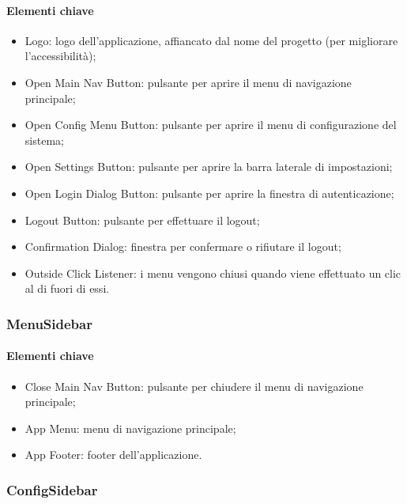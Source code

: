 \paragraph*{Elementi chiave}
\begin{itemize}
  \item Logo: logo dell'applicazione, affiancato dal nome del progetto (per migliorare l'accessibilità);
  \item Open Main Nav Button: pulsante per aprire il menu di navigazione principale;
  \item Open Config Menu Button: pulsante per aprire il menu di configurazione del sistema;
  \item Open Settings Button: pulsante per aprire la barra laterale di impostazioni;
  \item Open Login Dialog Button: pulsante per aprire la finestra di autenticazione;
  \item Logout Button: pulsante per effettuare il logout;
  \item Confirmation Dialog: finestra per confermare o rifiutare il logout;
  \item Outside Click Listener: i menu vengono chiusi quando viene effettuato un clic al di fuori di essi.
\end{itemize}

\subsubsection{MenuSidebar}

\paragraph*{Elementi chiave}
\begin{itemize}
  \item Close Main Nav Button: pulsante per chiudere il menu di navigazione principale;
  \item App Menu: menu di navigazione principale;
  \item App Footer: footer dell'applicazione.
\end{itemize}

\subsubsection{ConfigSidebar}

